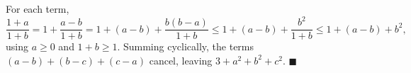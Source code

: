 For each term,
\[\dfrac{1+a}{1+b}=1+\dfrac{a-b}{1+b}=1+(a-b)+\dfrac{b(b-a)}{1+b}\le1+(a-b)+\dfrac{b^2}{1+b}\le1+(a-b)+b^2,\]
using $a\ge0$ and $1+b\ge1$. Summing cyclically, the terms $(a-b)+(b-c)+(c-a)$ cancel, leaving $3+a^2+b^2+c^2$. $\blacksquare$

